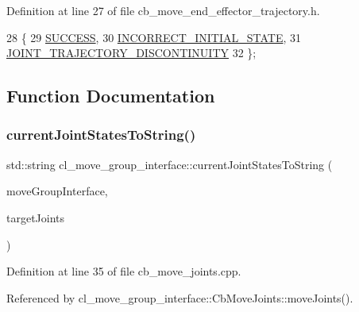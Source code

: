 Definition at line 27 of file cb\+\_\+move\+\_\+end\+\_\+effector\+\_\+trajectory.\+h.


\begin{DoxyCode}
28   \{
29     \hyperlink{classSUCCESS}{SUCCESS},
30     \hyperlink{namespacecl__move__group__interface_ae5fc1caf9a16ae5ad1c97c2e137a7017a1b748367c8d468cb9b65ecd6b2eab32c}{INCORRECT\_INITIAL\_STATE},
31     \hyperlink{namespacecl__move__group__interface_ae5fc1caf9a16ae5ad1c97c2e137a7017a3e86842785cd7c42003e516418347c8e}{JOINT\_TRAJECTORY\_DISCONTINUITY}
32   \};
\end{DoxyCode}


\subsection{Function Documentation}
\mbox{\label{namespacecl__move__group__interface_aad71400738b3e25d9fa9ac924670de5d}} 
\subsubsection{\texorpdfstring{current\+Joint\+States\+To\+String()}{currentJointStatesToString()}}
{\footnotesize\ttfamily std\+::string cl\+\_\+move\+\_\+group\+\_\+interface\+::current\+Joint\+States\+To\+String (\begin{DoxyParamCaption}\item[{moveit\+::planning\+\_\+interface\+::\+Move\+Group\+Interface \&}]{move\+Group\+Interface,  }\item[{std\+::map$<$ std\+::string, double $>$ \&}]{target\+Joints }\end{DoxyParamCaption})}



Definition at line 35 of file cb\+\_\+move\+\_\+joints.\+cpp.



Referenced by cl\+\_\+move\+\_\+group\+\_\+interface\+::\+Cb\+Move\+Joints\+::move\+Joints().


